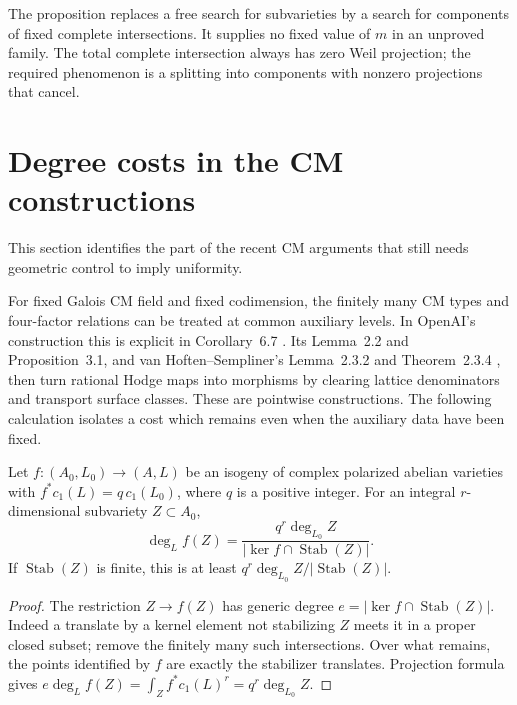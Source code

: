 The proposition replaces a free search for subvarieties by a search for components of fixed complete intersections. It supplies no fixed value of $m$ in an unproved family. The total complete intersection always has zero Weil projection; the required phenomenon is a splitting into components with nonzero projections that cancel.

\section{Degree costs in the CM constructions}
\label{sec:cm-cost}
This section identifies the part of the recent CM arguments that still needs geometric control to imply uniformity.

For fixed Galois CM field and fixed codimension, the finitely many CM types and four-factor relations can be treated at common auxiliary levels. In OpenAI's construction this is explicit in Corollary~6.7 \cite{OpenAICM}. Its Lemma~2.2 and Proposition~3.1, and van Hoften--Sempliner's Lemma~2.3.2 and Theorem~2.3.4 \cite{vHS}, then turn rational Hodge maps into morphisms by clearing lattice denominators and transport surface classes. These are pointwise constructions. The following calculation isolates a cost which remains even when the auxiliary data have been fixed.

\begin{proposition}\label{prop:transport}
Let $f:(A_0,L_0)\to(A,L)$ be an isogeny of complex polarized abelian varieties with $f^*c_1(L)=q\,c_1(L_0)$, where $q$ is a positive integer. For an integral $r$-dimensional subvariety $Z\subset A_0$,
\[
 \deg_L f(Z)=
 \frac{q^r\deg_{L_0}Z}
 {|\ker f\cap\operatorname{Stab}(Z)|}.
\]
If $\operatorname{Stab}(Z)$ is finite, this is at least
$q^r\deg_{L_0}Z/|\operatorname{Stab}(Z)|$.
\end{proposition}

\begin{proof}
The restriction $Z\to f(Z)$ has generic degree
$e=|\ker f\cap\operatorname{Stab}(Z)|$. Indeed a translate by a kernel element not stabilizing $Z$ meets it in a proper closed subset; remove the finitely many such intersections. Over what remains, the points identified by $f$ are exactly the stabilizer translates. Projection formula gives
$e\deg_L f(Z)=\int_Zf^*c_1(L)^r=q^r\deg_{L_0}Z$.
\end{proof}

